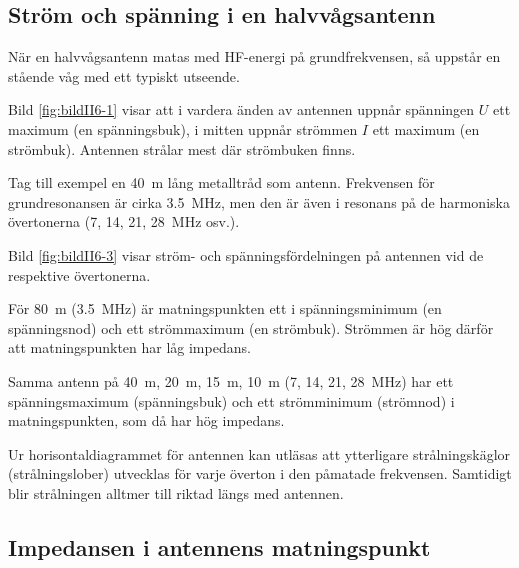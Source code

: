 \subsection{Ström och spänning i en halvvågs\-antenn}


När en halvvågsantenn matas med HF-energi på grundfrekvensen, så uppstår en
stående våg med ett typiskt utseende.

Bild \ref{fig:bildII6-1} visar att i vardera änden av antennen uppnår spänningen
\(U\) ett maximum (en spänningsbuk), i mitten uppnår strömmen \(I\)
ett maximum (en strömbuk).
Antennen strålar mest där strömbuken finns.

Tag till exempel en \SI{40}{\metre} lång metalltråd som antenn.
Frekvensen för grundresonansen är cirka \SI{3,5}{\mega\hertz}, men den är även i
resonans på de harmoniska övertonerna (7, 14, 21, \SI{28}{\mega\hertz} osv.).

Bild \ref{fig:bildII6-3} visar ström- och spänningsfördelningen på antennen vid
de respektive övertonerna.

För \SI{80}{\metre} (\SI{3,5}{\mega\hertz}) är matningspunkten ett i
spänningsminimum (en spänningsnod) och ett strömmaximum (en strömbuk).
Strömmen är hög därför att matningspunkten har låg impedans.

Samma antenn på \SI{40}{\metre}, \SI{20}{\metre}, \SI{15}{\metre},
\SI{10}{\metre} (7, 14, 21, \SI{28}{\mega\hertz}) har ett spänningsmaximum
(spänningsbuk) och ett strömminimum (strömnod) i matningspunkten, som då har hög
impedans.

Ur horisontaldiagrammet för antennen kan utläsas att ytterligare
strålningskäglor (strålningslober) utvecklas för varje överton i den
påmatade frekvensen.
Samtidigt blir strålningen alltmer till riktad längs med antennen.

\subsection{Impedansen i antennens matningspunkt}
\label{antenner_impedans}


